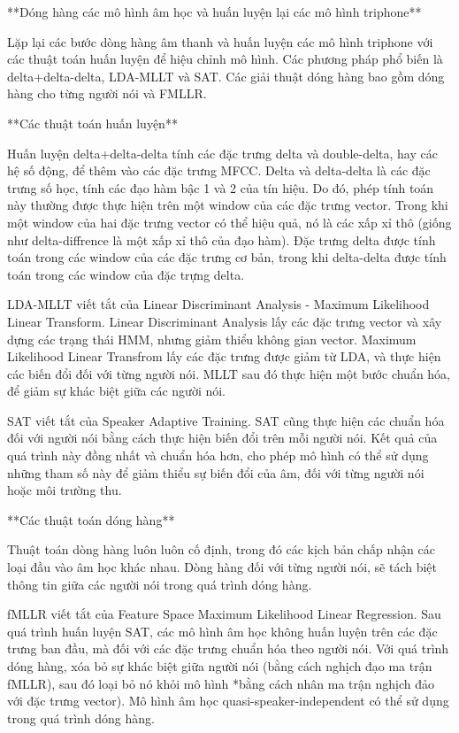 **Dóng hàng các mô hình âm học và huấn luyện lại các mô hình triphone**

Lặp lại các bước dòng hàng âm thanh và huấn luyện các mô hình triphone với các thuật toán huấn luyện để hiệu chỉnh mô hình. Các phương pháp phổ biến là delta+delta-delta, LDA-MLLT và SAT. Các giải thuật dóng hàng bao gồm dóng hàng cho từng người nói và FMLLR.

**Các thuật toán huấn luyện**

Huấn luyện delta+delta-delta tính các đặc trưng delta và double-delta, hay các hệ số động, để thêm vào các đặc trưng MFCC. Delta và delta-delta là các đặc trưng số học, tính các đạo hàm bậc 1 và 2 của tín hiệu. Do đó, phép tính toán này thường được thực hiện trên một window của các đặc trưng vector. Trong khi một window của hai đặc trưng vector có thể hiệu quả, nó là các xấp xỉ thô (giống như delta-diffrence là một xấp xỉ thô của đạo hàm). Đặc trưng delta được tính toán trong các window của các đặc trưng cơ bản, trong khi delta-delta được tính toán trong các window của đặc trựng delta.

LDA-MLLT viết tắt của Linear Discriminant Analysis - Maximum Likelihood Linear Transform. Linear Discriminant Analysis lấy các đặc trưng vector và xây dựng các trạng thái HMM, nhưng giảm thiểu không gian vector. Maximum Likelihood Linear Transfrom lấy các đặc trưng được giảm từ LDA, và thực hiện các biến đổi đối với từng người nói. MLLT sau đó thực hiện một bước chuẩn hóa, để giảm sự khác biệt giữa các người nói.

SAT viết tắt của Speaker Adaptive Training. SAT cũng thực hiện các chuẩn hóa đối với người nói bằng cách thực hiện biến đổi trên mỗi người nói. Kết quả của quá trình này đồng nhất và chuẩn hóa hơn, cho phép mô hình có thể sử dụng những tham số này để giảm thiểu sự biến đổi của âm, đối với từng người nói hoặc môi trường thu.

**Các thuật toán dóng hàng**

Thuật toán dòng hàng luôn luôn cố định, trong đó các kịch bản chấp nhận các loại đầu vào âm học khác nhau. Dòng hàng đối với từng người nói, sẽ tách biệt thông tin giữa các người nói trong quá trình dóng hàng.

fMLLR viết tắt của Feature Space Maximum Likelihood Linear Regression. Sau quá trình huấn luyện SAT, các mô hình âm học không huấn luyện trên các đặc trưng ban đầu, mà đối với các đặc trưng chuẩn hóa theo người nói. Với quá trình dóng hàng, xóa bỏ sự khác biệt giữa người nói (bằng cách nghịch đạo ma trận fMLLR), sau đó loại bỏ nó khỏi mô hình *bằng cách nhân ma trận nghịch đảo với đặc trưng vector). Mô hình âm học quasi-speaker-independent có thể sử dụng trong quá trình dóng hàng.

